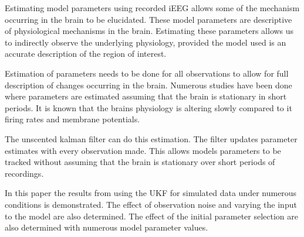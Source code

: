 Estimating model parameters using recorded iEEG allows some of the mechanism occurring in the brain to be elucidated.
	These model parameters are descriptive of physiological mechanisms in the brain.
	Estimating these parameters allows us to indirectly observe the underlying physiology, provided the model used is an accurate description of the region of 			interest.

Estimation of parameters needs to be done for all observations to allow for full description of changes occurring in the brain.
	Numerous studies have been done where parameters are estimated assuming that the brain is stationary in short periods.
	It is known that the brains physiology is altering slowly compared to it firing rates and membrane potentials.

The unscented kalman filter can do this estimation.
	The filter updates parameter estimates with every observation made.
	This allows models parameters to be tracked without assuming that the brain is stationary over short periods of recordings.

In this paper the results from using the UKF for simulated data under numerous conditions is demonstrated.
	The effect of observation noise and varying the input to the model are also determined.
	The effect of the initial parameter selection are also determined with numerous model parameter values. 

 

